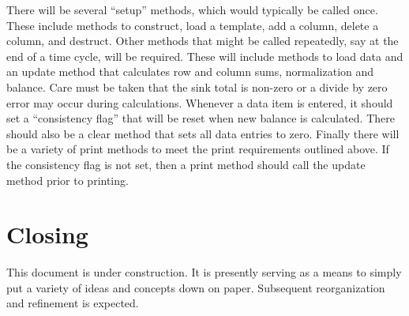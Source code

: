 \documentclass[reqno]{lanl}
\begin{document}
There will be several ``setup'' methods, which would typically
be called once. These include methods to 
 construct, load a template, add a column,
delete a column, and destruct. Other methods that might  be
called repeatedly, say at the end of a time
cycle, will be required. These will include
methods to load data and an update method that calculates row and column
sums, normalization and balance. 
Care must be taken that the sink total is non-zero or a 
divide by zero error may occur during calculations.
Whenever a data item is entered, it should set a ``consistency
flag'' that will be reset when new balance is calculated.
There should also be a clear method that sets all data entries to zero.
Finally there will be a variety of print methods to meet the print requirements
outlined above. If the consistency flag is not set, then a print method
should call the update method prior to printing.

\section{Closing}

This document is under construction. It is presently serving
as a means to simply put a variety of ideas and concepts 
down on paper. Subsequent reorganization
and refinement is expected.


\end{document}
